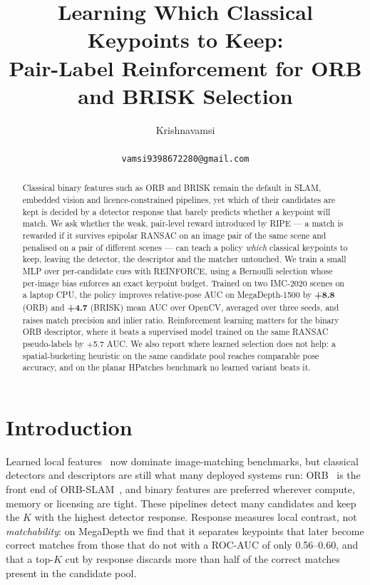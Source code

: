 \documentclass[10pt,twocolumn,letterpaper]{article}
\title{Learning Which Classical Keypoints to Keep:\\Pair-Label Reinforcement for ORB and BRISK Selection}
\author{Krishnavamsi\\\todo{Affiliation}\\{\tt\small vamsi9398672280@gmail.com}}
\date{}
\newcommand{\best}[1]{\textbf{#1}}
\begin{document}
\maketitle

\begin{abstract}
Classical binary features such as ORB and BRISK remain the default in SLAM, embedded vision and
licence-constrained pipelines, yet which of their candidates are kept is decided by a detector
response that barely predicts whether a keypoint will match. We ask whether the weak, pair-level reward
introduced by RIPE --- a match is rewarded if it survives epipolar RANSAC on an image pair of the same
scene and penalised on a pair of different scenes --- can teach a policy \emph{which} classical keypoints
to keep, leaving the detector, the descriptor and the matcher untouched. We train a small MLP over
per-candidate cues with REINFORCE, using a Bernoulli selection whose per-image bias enforces an exact
keypoint budget. Trained on two IMC-2020 scenes on a laptop CPU, the policy improves relative-pose AUC on
MegaDepth-1500 by \best{+8.8} (ORB) and \best{+4.7} (BRISK) mean AUC over OpenCV, averaged over three
seeds, and raises match precision and inlier ratio. Reinforcement learning matters for the binary ORB
descriptor, where it beats a supervised model trained on the same RANSAC pseudo-labels by +5.7 AUC.
We also report where learned selection does not help: a spatial-bucketing heuristic on the same
candidate pool reaches comparable pose accuracy, and on the planar HPatches benchmark no learned variant
beats it.
\end{abstract}

\section{Introduction}
\label{sec:intro}

Learned local features~\cite{detone2018superpoint,tyszkiewicz2020disk,zhao2023aliked,kunzel2025ripe}
now dominate image-matching benchmarks, but classical detectors and descriptors are still what many
deployed systems run: ORB~\cite{rublee2011orb} is the front end of ORB-SLAM~\cite{murartal2015orbslam},
and binary features are preferred wherever compute, memory or licensing are tight. These pipelines
detect many candidates and keep the $K$ with the highest detector response. Response measures local
contrast, not \emph{matchability}: on MegaDepth we find that it separates keypoints that later become
correct matches from those that do not with a ROC-AUC of only 0.56--0.60, and that a top-$K$ cut by
response discards more than half of the correct matches present in the candidate pool.
\end{document}
